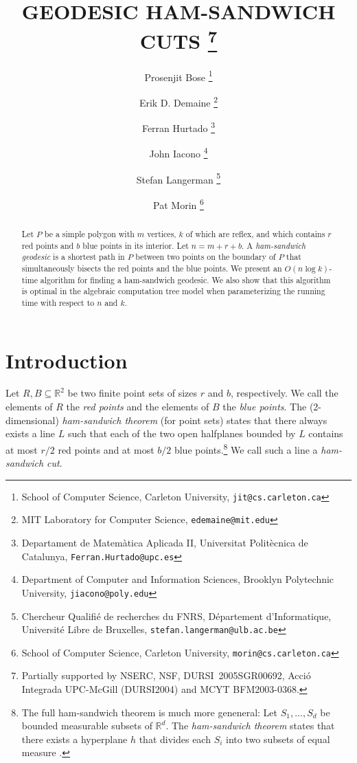 \documentclass[charterfonts,lotsofwhite]{patmorin}
\newcommand{\email}[1]{\texttt{#1}}
\begin{document}
\title{\MakeUppercase{Geodesic Ham-Sandwich Cuts}%
  \thanks{Partially supported by  NSERC, NSF, DURSI~2005SGR00692, Acció Integrada
UPC-McGill (DURSI2004) and MCYT BFM2003-0368.}}
\author{Prosenjit Bose%
	\thanks{School of Computer Science, Carleton University,
		\email{jit@cs.carleton.ca}}
   \and Erik D. Demaine%
	\thanks{MIT Laboratory for Computer Science, 
		\email{edemaine@mit.edu}}
   \and Ferran Hurtado%
	\thanks{Departament de Matem\`atica Aplicada II, 
		Universitat Polit\`ecnica de Catalunya, 
		\email{Ferran.Hurtado@upc.es}}
   \and John Iacono%
        \thanks{Department of Computer and Information Sciences,
		Brooklyn Polytechnic University,
		\email{jiacono@poly.edu}}
   \and Stefan Langerman%
	\thanks{Chercheur Qualifi\'e de recherches du FNRS, 
		D\'epartement d'Informatique,
		Universit\'e Libre de Bruxelles,
		\email{stefan.langerman@ulb.ac.be}}
   \and Pat Morin%
        \thanks{School of Computer Science, Carleton University,
		\email{morin@cs.carleton.ca}}
}
\date{}
\maketitle

\begin{abstract} Let $P$ be a simple polygon with $m$ vertices, $k$ of
which are reflex, and which contains $r$ red points and $b$ blue
points in its interior.  Let $n=m+r+b$. A \emph{ham-sandwich geodesic}
is a shortest path in $P$ between two points on the boundary of $P$
that simultaneously bisects the red points and the blue points.  We
present an $O(n \log k)$-time algorithm for finding a ham-sandwich
geodesic.  We also show that this algorithm is optimal in the
algebraic computation tree model when parameterizing the running time
with respect to $n$ and $k$.  \end{abstract}


\section{Introduction}

Let $R,B\subseteq \mathbb{R}^2$ be two finite point sets of sizes $r$
and $b$, respectively.  We call the elements of $R$ the \emph{red
points} and the elements of $B$ the \emph{blue points}.  The
(2-dimensional) \emph{ham-sandwich theorem} (for point sets) states
that there always exists a line $L$ such that each of the two open
halfplanes bounded by $L$ contains at most $r/2$ red points and at
most $b/2$ blue points.\footnote{The full ham-sandwich theorem is much
more geneneral:  Let $S_1,\ldots,S_d$ be bounded measurable subsets of
$\mathbb{R}^d$.  The \emph{ham-sandwich theorem} states that there
exists a hyperplane $h$ that divides each $S_i$ into two subsets of
equal measure \cite{st42}.}  We call such a line a \emph{ham-sandwich
cut}.
\end{document}
